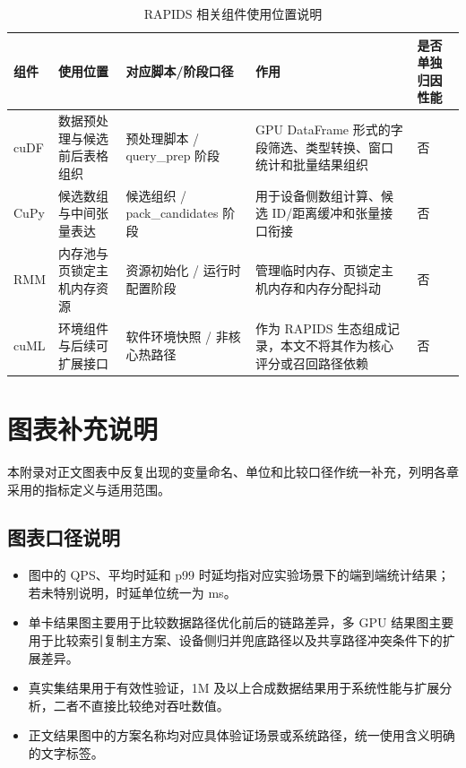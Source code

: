 \begin{table}[htbp]
  \caption{RAPIDS 相关组件使用位置说明}
  \label{tab:rapids-component-usage}
  \centering
  \footnotesize
  \setlength{\tabcolsep}{2.4pt}
  \renewcommand{\arraystretch}{1.16}
  \begin{adjustbox}{max width=\linewidth}
  \begin{tabular}{P{1.8cm}P{3.0cm}P{3.4cm}P{4.0cm}P{2.3cm}}
    \toprule
    组件 & 使用位置 & 对应脚本/阶段口径 & 作用 & 是否单独归因性能 \\
    \midrule
    cuDF & 数据预处理与候选前后表格组织 & 预处理脚本 / query\_prep 阶段 & GPU DataFrame 形式的字段筛选、类型转换、窗口统计和批量结果组织 & 否 \\
    CuPy & 候选数组与中间张量表达 & 候选组织 / pack\_candidates 阶段 & 用于设备侧数组计算、候选 ID/距离缓冲和张量接口衔接 & 否 \\
    RMM & 内存池与页锁定主机内存资源 & 资源初始化 / 运行时配置阶段 & 管理临时内存、页锁定主机内存和内存分配抖动 & 否 \\
    cuML & 环境组件与后续可扩展接口 & 软件环境快照 / 非核心热路径 & 作为 RAPIDS 生态组成记录，本文不将其作为核心评分或召回路径依赖 & 否 \\
    \bottomrule
  \end{tabular}
  \end{adjustbox}
\end{table}


\chapter{图表补充说明}

本附录对正文图表中反复出现的变量命名、单位和比较口径作统一补充，列明各章采用的指标定义与适用范围。

\section{图表口径说明}

\begin{itemize}
  \item 图中的 QPS、平均时延和 p99 时延均指对应实验场景下的端到端统计结果；若未特别说明，时延单位统一为 ms。
  \item 单卡结果图主要用于比较数据路径优化前后的链路差异，多 GPU 结果图主要用于比较索引复制主方案、设备侧归并兜底路径以及共享路径冲突条件下的扩展差异。
  \item 真实集结果用于有效性验证，1M 及以上合成数据结果用于系统性能与扩展分析，二者不直接比较绝对吞吐数值。
  \item 正文结果图中的方案名称均对应具体验证场景或系统路径，统一使用含义明确的文字标签。
\end{itemize}

